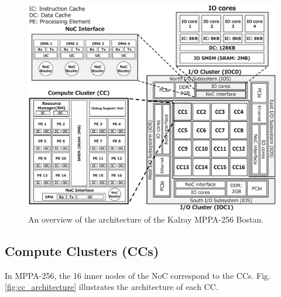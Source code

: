 \begin{figure}[!htbp]
  \centering
  \includegraphics[width=0.9\linewidth]{../figure/mppa_architecture.eps}
      \caption{\label{fig:mppa_architecture}
    An overview of the architecture of the Kalray MPPA-256 Bostan.}
  \end{figure}

\subsection{Compute Clusters (CCs)}
\label{sec:cc}
In MPPA-256, the 16 inner nodes of the NoC correspond to the CCs.
Fig. \ref{fig:cc_architecture} illustrates the architecture of each CC.

